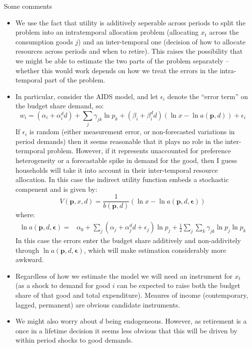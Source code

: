 \documentclass[12pt]{article}
\begin{document}
Some comments
\begin{itemize}
\item We use the fact that utility is additively seperable across periods to split the problem into an intratemporal allocation problem (allocating $x_t$ across the consumption goods $j$) and an inter-temporal one (decision of how to allocate resources across periods and when to retire). This raises the possibility that we might be able to estimate the two parts of the problem separately -- whether this would work depends on how we treat the errors in the intra-temporal part of the problem.
\item In particular, consider the AIDS model, and let $\epsilon_i$ denote the ``error term'' on the budget share demand, so:
\begin{equation*}
w_i=\left(\alpha_i+\alpha_i^d d \right)+\sum_j \gamma_{jk}\ln p_k + \left(\beta_i+\beta_i^d d \right)\left(\ln x-\ln a(\mathbf{p},d) \right)+\epsilon_i
\end{equation*}
If $\epsilon_i$ is random (either measurement error, or non-forecasted variations in period demands) then it seems reasonable that it plays no role in the inter-termporal problem. However, if it represents unaccounted for preference heterogeneity or a forecastable spike in demand for the good, then I guess households will take it into account in their inter-temporal resource allocation. In this case the indirect utility function embeds a stochastic compenent and is given by:
\begin{equation*}
V(\mathbf{p},x,d)=\frac{1}{b(\mathbf{p},d)}\left(\ln x-\ln a(\mathbf{p},d,\boldsymbol{\epsilon})\right)
\end{equation*}
where:
\begin{align*}
\ln a(\mathbf{p},d,\boldsymbol{\epsilon}) =& \alpha_0+\sum_j \left(\alpha_j+\alpha_j^d d+\epsilon_j \right)\ln p_j +\frac{1}{2}\sum_j \sum_k \gamma_{jk}\ln p_j \ln p_k
\end{align*}
In this case the errors enter the budget share additively and non-addivitely through $\ln a(\mathbf{p},d,\boldsymbol{\epsilon})$, which will make estimation considerably more awkward.
\item Regardless of how we estimate the model we will need an instrument for $x_t$ (as a shock to demand for good $i$ can be expected to raise both the budget share of that good and total expenditure). Meaures of income (contemporary, lagged, permanent) are obvious candidate instruments.
\item We might also worry about $d$ being endogeneous. However, as retirement is a once in a lifetime decision it seems less obvious that this will be driven by within period shocks to good demands.

\end{itemize}
\end{document}
